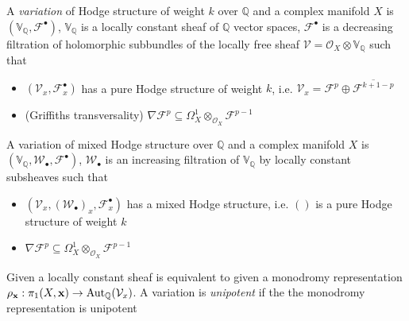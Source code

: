 \documentclass[main]{subfiles}
\begin{document}
\begin{definition}
A \textit{variation} of Hodge structure of weight $k$ over $\mathbb Q$ and a complex manifold $X$ is $(\mathbb V_{\mathbb Q},\mathcal F^\bullet)$, $\mathbb V_{\mathbb Q}$ is a locally constant sheaf of $\mathbb Q$ vector spaces, $\mathcal F^\bullet$ is a decreasing filtration of holomorphic subbundles of the locally free sheaf $\mathcal V=\mathcal O_X\otimes\mathbb V_{\mathbb Q}$ such that
\begin{itemize}
\item $(\mathcal V_x,\mathcal F^\bullet_x)$ has a pure Hodge structure of weight $k$, i.e. $\mathcal V_x=\mathcal F^p\oplus\overline{\mathcal F^{k+1-p}}$
\item (Griffiths transversality) $\nabla\mathcal F^p\subseteq\Omega^1_X\otimes_{\mathcal O_X}\mathcal F^{p-1}$
\end{itemize}
\end{definition}

\begin{definition}
A variation of mixed Hodge structure over $\mathbb Q$ and a complex manifold $X$ is $(\mathbb V_{\mathbb Q},\mathcal W_\bullet,\mathcal F^\bullet)$, $\mathcal W_\bullet$ is an increasing filtration of $\mathbb V_{\mathbb Q}$ by locally constant subsheaves such that
\begin{itemize}
\item $(\mathcal V_x,(\mathcal W_\bullet)_x,\mathcal F^\bullet_x)$ has a mixed Hodge structure, i.e. $()$ is a pure Hodge structure of weight $k$
\item $\nabla\mathcal F^p\subseteq\Omega^1_X\otimes_{\mathcal O_X}\mathcal F^{p-1}$
\end{itemize}
\end{definition}

\begin{remark}
Given a locally constant sheaf is equivalent to given a monodromy representation $\rho_{\mathbf x}:\pi_1(X,\mathbf x)\to\operatorname{Aut}_{\mathbb Q}(\mathcal V_x)$. A variation is \textit{unipotent} if the the monodromy representation is unipotent
\end{remark}
\end{document}
